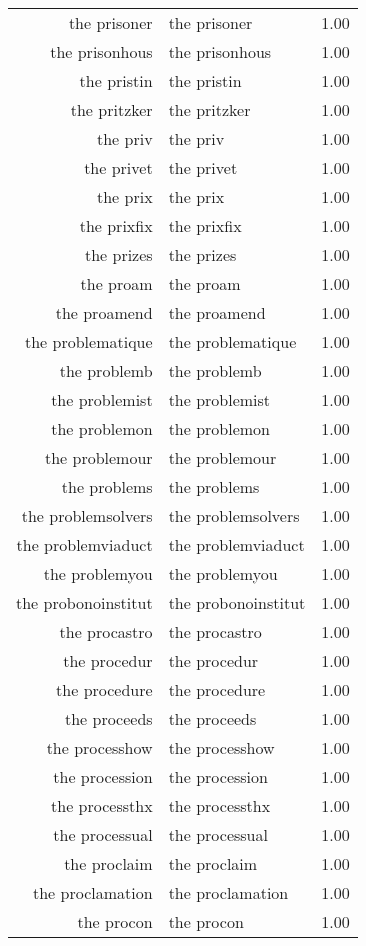 \begin{table}[ht]
\begin{tabular}{rlr}
  the prisoner & the prisoner & 1.00 \\ 
  the prisonhous & the prisonhous & 1.00 \\ 
  the pristin & the pristin & 1.00 \\ 
  the pritzker & the pritzker & 1.00 \\ 
  the priv & the priv & 1.00 \\ 
  the privet & the privet & 1.00 \\ 
  the prix & the prix & 1.00 \\ 
  the prixfix & the prixfix & 1.00 \\ 
  the prizes & the prizes & 1.00 \\ 
  the proam & the proam & 1.00 \\ 
  the proamend & the proamend & 1.00 \\ 
  the problematique & the problematique & 1.00 \\ 
  the problemb & the problemb & 1.00 \\ 
  the problemist & the problemist & 1.00 \\ 
  the problemon & the problemon & 1.00 \\ 
  the problemour & the problemour & 1.00 \\ 
  the problems & the problems & 1.00 \\ 
  the problemsolvers & the problemsolvers & 1.00 \\ 
  the problemviaduct & the problemviaduct & 1.00 \\ 
  the problemyou & the problemyou & 1.00 \\ 
  the probonoinstitut & the probonoinstitut & 1.00 \\ 
  the procastro & the procastro & 1.00 \\ 
  the procedur & the procedur & 1.00 \\ 
  the procedure & the procedure & 1.00 \\ 
  the proceeds & the proceeds & 1.00 \\ 
  the processhow & the processhow & 1.00 \\ 
  the procession & the procession & 1.00 \\ 
  the processthx & the processthx & 1.00 \\ 
  the processual & the processual & 1.00 \\ 
  the proclaim & the proclaim & 1.00 \\ 
  the proclamation & the proclamation & 1.00 \\ 
  the procon & the procon & 1.00 \\ 

\end{tabular}
\end{table}
